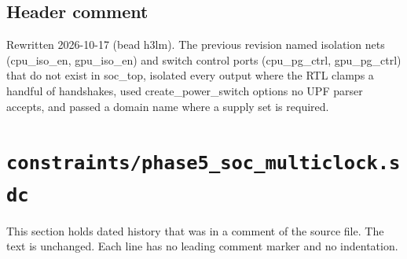 \begin{record}

\subsection*{Header comment}

\begin{textblock}
Rewritten 2026-10-17 (bead h3lm).  The previous revision named isolation
nets (cpu_iso_en, gpu_iso_en) and switch control ports (cpu_pg_ctrl,
gpu_pg_ctrl) that do not exist in soc_top, isolated every output where the
RTL clamps a handful of handshakes, used create_power_switch options no UPF
parser accepts, and passed a domain name where a supply set is required.

\end{textblock}

\end{record}

\section{\texttt{constraints/phase5\_soc\_multiclock.sdc}}\label{cr:pd:phase5-soc-multiclock-sdc}

This section holds dated history that was in a comment of the source file. The text is unchanged. Each line has no leading comment marker and no indentation.


